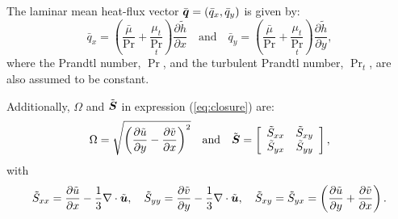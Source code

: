 \documentclass[10pt]{article}
\newcommand{\diff}[2] {\dfrac{\partial #1}{\partial #2}}
\newcommand{\bv}[1]{\ensuremath{\mbox{\boldmath$ #1 $}}}
\newcommand{\tS}{\tilde{S}}
\begin{document}
 The laminar mean heat-flux vector $\bar{\bv{q}}=(\bar{q}_x,\bar{q}_y)$ is given by:
%
\begin{equation}\label{eq:closure02}
 \bar{q}_x = \left(\dfrac{\bar{\mu}}{\Pr}+\dfrac{\mu_t}{\Pr_t}\right)\diff{\tilde{h}}{x}\quad \mbox{and} \quad \bar{q}_y = \left(\dfrac{\bar{\mu}}{\Pr}+\dfrac{\mu_t}{\Pr_t}\right)\diff{\tilde{h}}{y},
 \end{equation}
where the Prandtl number, $\Pr$, and the turbulent Prandtl number, $\Pr_t$, are also assumed to be constant.

Additionally, $\Omega$ and $\tilde{\bv{S}}$ in expression (\ref{eq:closure}) are:
\begin{gather*}
\label{eq:closure03}
 \Omega = \sqrt{\left( \diff{\tilde{u}}{y} - \diff{\tilde{v}}{x}\right)^2} \quad \mbox{and}\quad 
\tilde{\bv{S}}=\left[
\begin{array}{cc}
\tS_{xx} & \tS_{xy}\\
\tS_{yx} & \tS_{yy}
\end{array}\right] , 
\end{gather*}
with
\begin{equation*}
\tS_{xx}= \diff{\tilde{u}}{x}-\dfrac{1}{3} \nabla \cdot \tilde{\bv{u}},\quad \tS_{yy}= \diff{\tilde{v}}{y}-\dfrac{1}{3} \nabla \cdot \tilde{\bv{u}}, \quad \tS_{xy}= \tS_{yx}= \left( \diff{\tilde{u}}{y} + \diff{\tilde{v}}{x}\right).\\
\end{equation*}

\end{document}
